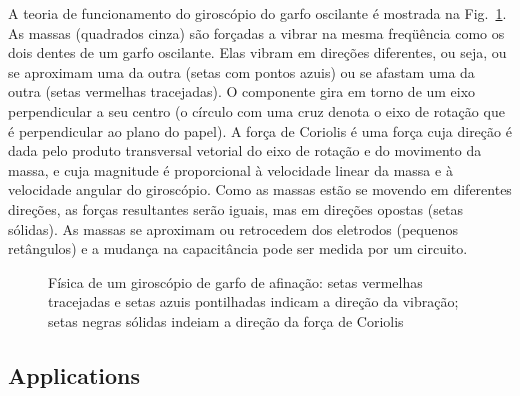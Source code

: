 {A teoria de funcionamento do giroscópio do garfo oscilante é mostrada na Fig.~\ref{fig.tuning-gyro}. As massas (quadrados cinza) são forçadas a vibrar na mesma freqüência como os dois dentes de um garfo oscilante. Elas vibram em direções diferentes, ou seja, ou se aproximam uma da outra (setas com pontos azuis) ou se afastam uma da outra (setas vermelhas tracejadas). O componente gira em torno de um eixo perpendicular a seu centro (o círculo com uma cruz denota o eixo de rotação que é perpendicular ao plano do papel). A força de Coriolis é uma força cuja direção é dada pelo produto transversal vetorial do eixo de rotação e do movimento da massa, e cuja magnitude é proporcional à velocidade linear da massa e à velocidade angular do giroscópio. Como as massas estão se movendo em diferentes direções, as forças resultantes serão iguais, mas em direções opostas (setas sólidas). As massas se aproximam ou retrocedem dos eletrodos (pequenos retângulos) e a mudança na capacitância pode ser medida por um circuito.

\begin{figure}
\begin{center}
\end{center}
\caption{Física de um giroscópio de garfo de afinação: setas vermelhas tracejadas e setas azuis pontilhadas indicam a direção da vibração; setas negras sólidas indeiam a direção da força de Coriolis}\label{fig.tuning-gyro}
\end{figure}

\subsection{Applications}

}
